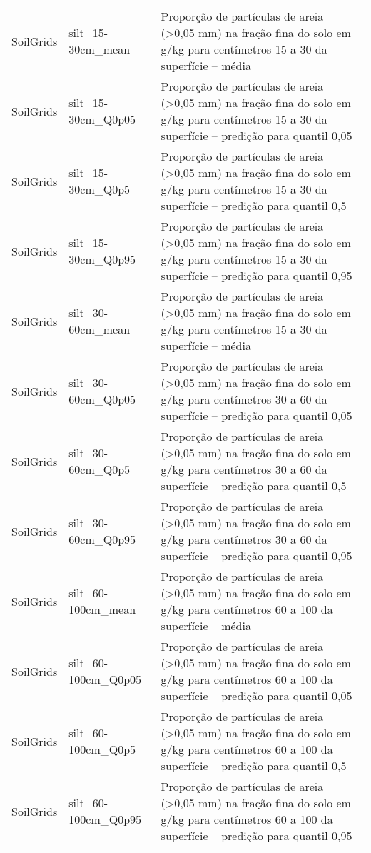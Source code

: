 \begin{longtable}{@{} p{4cm} p{4cm} p{8cm} @{}}
	SoilGrids &
	silt\_15-30cm\_mean &
	Proporção de partículas de areia (\textgreater 0,05 mm) na fração fina do solo em g/kg para centímetros 15 a 30 da superfície – média \\
	SoilGrids &
	silt\_15-30cm\_Q0p05 &
	Proporção de partículas de areia (\textgreater 0,05 mm) na fração fina do solo em g/kg para centímetros 15 a 30 da superfície – predição para quantil 0,05 \\
	SoilGrids &
	silt\_15-30cm\_Q0p5 &
	Proporção de partículas de areia (\textgreater 0,05 mm) na fração fina do solo em g/kg para centímetros 15 a 30 da superfície – predição para quantil 0,5 \\
	SoilGrids &
	silt\_15-30cm\_Q0p95 &
	Proporção de partículas de areia (\textgreater 0,05 mm) na fração fina do solo em g/kg para centímetros 15 a 30 da superfície – predição para quantil 0,95 \\
	SoilGrids &
	silt\_30-60cm\_mean &
	Proporção de partículas de areia (\textgreater 0,05 mm) na fração fina do solo em g/kg para centímetros 15 a 30 da superfície – média \\
	SoilGrids &
	silt\_30-60cm\_Q0p05 &
	Proporção de partículas de areia (\textgreater 0,05 mm) na fração fina do solo em g/kg para centímetros 30 a 60 da superfície – predição para quantil 0,05 \\
	SoilGrids &
	silt\_30-60cm\_Q0p5 &
	Proporção de partículas de areia (\textgreater 0,05 mm) na fração fina do solo em g/kg para centímetros 30 a 60 da superfície – predição para quantil 0,5 \\
	SoilGrids &
	silt\_30-60cm\_Q0p95 &
	Proporção de partículas de areia (\textgreater 0,05 mm) na fração fina do solo em g/kg para centímetros 30 a 60 da superfície – predição para quantil 0,95 \\
	SoilGrids &
	silt\_60-100cm\_mean &
	Proporção de partículas de areia (\textgreater 0,05 mm) na fração fina do solo em g/kg para centímetros 60 a 100 da superfície – média \\
	SoilGrids &
	silt\_60-100cm\_Q0p05 &
	Proporção de partículas de areia (\textgreater 0,05 mm) na fração fina do solo em g/kg para centímetros 60 a 100 da superfície – predição para quantil 0,05 \\
	SoilGrids &
	silt\_60-100cm\_Q0p5 &
	Proporção de partículas de areia (\textgreater 0,05 mm) na fração fina do solo em g/kg para centímetros 60 a 100 da superfície – predição para quantil 0,5 \\
	SoilGrids &
	silt\_60-100cm\_Q0p95 &
	Proporção de partículas de areia (\textgreater 0,05 mm) na fração fina do solo em g/kg para centímetros 60 a 100 da superfície – predição para quantil 0,95 \\

\end{longtable}
